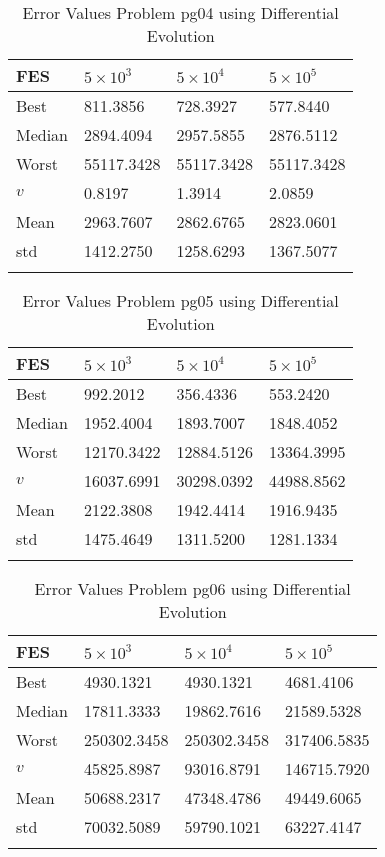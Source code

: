 \documentclass[10pt, a4paper]{book}
\begin{document}
\begin{center}
\begin{longtable}{l l l l}
FES & $5 \times 10^{3}$ & $5 \times 10^{4}$ & $5 \times 10^{5}$ \\
\hline
Best & 811.3856 & 728.3927 & 577.8440 \\
Median & 2894.4094 & 2957.5855 & 2876.5112 \\
Worst & 55117.3428 & 55117.3428 & 55117.3428 \\
$v$ & 0.8197 & 1.3914 & 2.0859 \\
Mean & 2963.7607 & 2862.6765 & 2823.0601 \\
std & 1412.2750 & 1258.6293 & 1367.5077 \\
\caption{ Error Values Problem pg04 using Differential Evolution }
\end{longtable}
\end{center}

\begin{center}
\begin{longtable}{l l l l}
FES & $5 \times 10^{3}$ & $5 \times 10^{4}$ & $5 \times 10^{5}$ \\
\hline
Best & 992.2012 & 356.4336 & 553.2420 \\
Median & 1952.4004 & 1893.7007 & 1848.4052 \\
Worst & 12170.3422 & 12884.5126 & 13364.3995 \\
$v$ & 16037.6991 & 30298.0392 & 44988.8562 \\
Mean & 2122.3808 & 1942.4414 & 1916.9435 \\
std & 1475.4649 & 1311.5200 & 1281.1334 \\
\caption{ Error Values Problem pg05 using Differential Evolution }
\end{longtable}
\end{center}

\begin{center}
\begin{longtable}{l l l l}
FES & $5 \times 10^{3}$ & $5 \times 10^{4}$ & $5 \times 10^{5}$ \\
\hline
Best & 4930.1321 & 4930.1321 & 4681.4106 \\
Median & 17811.3333 & 19862.7616 & 21589.5328 \\
Worst & 250302.3458 & 250302.3458 & 317406.5835 \\
$v$ & 45825.8987 & 93016.8791 & 146715.7920 \\
Mean & 50688.2317 & 47348.4786 & 49449.6065 \\
std & 70032.5089 & 59790.1021 & 63227.4147 \\
\caption{ Error Values Problem pg06 using Differential Evolution }
\end{longtable}
\end{center}
\end{document}
